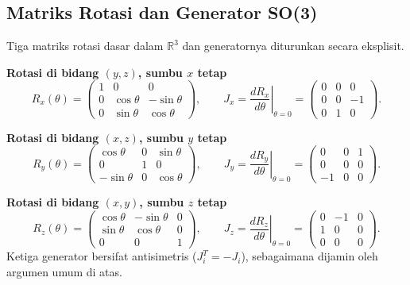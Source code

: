 \subsection{Matriks Rotasi dan Generator SO(3)}

Tiga matriks rotasi dasar dalam $\mathbb{R}^3$ dan generatornya diturunkan secara eksplisit.

\vspace{0.5em}
\noindent \textbf{Rotasi di bidang $(y,z)$, sumbu $x$ tetap}
\begin{equation}\label{a1-eq:Rx}
    R_x(\theta) = \begin{pmatrix}1 & 0 & 0 \\ 0 & \cos\theta & -\sin\theta \\ 0 & \sin\theta & \cos\theta\end{pmatrix},
    \qquad
    J_x = \left.\frac{dR_x}{d\theta}\right|_{\theta=0}
    = \begin{pmatrix}0 & 0 & 0 \\ 0 & 0 & -1 \\ 0 & 1 & 0\end{pmatrix}.
\end{equation}

\vspace{0.5em}
\noindent \textbf{Rotasi di bidang $(x,z)$, sumbu $y$ tetap}
\begin{equation}\label{a1-eq:Ry}
    R_y(\theta) = \begin{pmatrix}\cos\theta & 0 & \sin\theta \\ 0 & 1 & 0 \\ -\sin\theta & 0 & \cos\theta\end{pmatrix},
    \qquad
    J_y = \left.\frac{dR_y}{d\theta}\right|_{\theta=0}
    = \begin{pmatrix}0 & 0 & 1 \\ 0 & 0 & 0 \\ -1 & 0 & 0\end{pmatrix}.
\end{equation}

\vspace{0.5em}
\noindent \textbf{Rotasi di bidang $(x,y)$, sumbu $z$ tetap}
\begin{equation}\label{a1-eq:Rz}
    R_z(\theta) = \begin{pmatrix}\cos\theta & -\sin\theta & 0 \\ \sin\theta & \cos\theta & 0 \\ 0 & 0 & 1\end{pmatrix},
    \qquad
    J_z = \left.\frac{dR_z}{d\theta}\right|_{\theta=0}
    = \begin{pmatrix}0 & -1 & 0 \\ 1 & 0 & 0 \\ 0 & 0 & 0\end{pmatrix}.
\end{equation}
Ketiga generator bersifat antisimetris ($J_i^T = -J_i$), sebagaimana dijamin oleh argumen umum di atas.

